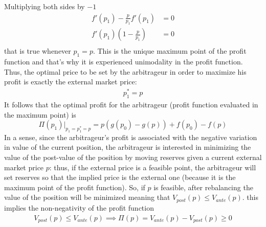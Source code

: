 \documentclass[12pt]{article}
\begin{document}
Multiplying both sides by $-1$
\begin{align*}
    f'(p_1)-\frac{p}{p_1}f'(p_1)        & = 0 \\
    f'(p_1)\left(1-\frac{p}{p_1}\right) & = 0 \\
\end{align*}
that is true whenever $p_1=p$. This is the unique maximum point of the profit function and that's why it is experienced unimodality in the profit function. Thus, the optimal price to be set by the arbitrageur in order to maximize his profit is exactly the external market price:
\begin{align}
    p_1^* = p
\end{align}
It follows that the optimal profit for the arbitrageur (profit function evaluated in the maximum point) is
\begin{equation}
    \Pi(p_1)|_{p_1=p_1^*=p}=p(g(p_0)-g(p))+f(p_0)-f(p)
\end{equation}
In a sense, since the arbitrageur's profit is associated with the negative variation in value of the current position, the arbitrageur is interested in minimizing the value of the post-value of the position by moving reserves given a current external market price $p$: thus, if the external price is a feasible point, the arbitrageur will set reserves so that the implied price is the external one (because it is the maximum point of the profit function). So, if $p$ is feasible, after rebalancing the value of the position will be minimized meaning that $V_{post}(p)\leq V_{ante}(p)$. this implies the non-negativity of the profit function
\begin{align*}
    V_{post}(p)\leq V_{ante}(p) \implies \Pi(p)=V_{ante}(p)-V_{post}(p)\geq 0
\end{align*}
\end{document}
